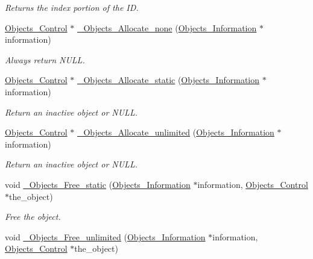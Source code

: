 \begin{DoxyCompactItemize}
\begin{DoxyCompactList}\small\item\em Returns the index portion of the ID. \end{DoxyCompactList}\item 
\mbox{\hyperlink{structObjects__Control}{Objects\+\_\+\+Control}} $\ast$ \mbox{\hyperlink{group__RTEMSScoreObject_gab0861c8e235b2892f2785b6cf582c74e}{\+\_\+\+Objects\+\_\+\+Allocate\+\_\+none}} (\mbox{\hyperlink{structObjects__Information}{Objects\+\_\+\+Information}} $\ast$information)
\begin{DoxyCompactList}\small\item\em Always return N\+U\+LL. \end{DoxyCompactList}\item 
\mbox{\hyperlink{structObjects__Control}{Objects\+\_\+\+Control}} $\ast$ \mbox{\hyperlink{group__RTEMSScoreObject_ga93a072e4b17ff04e60d29e57e6901ce1}{\+\_\+\+Objects\+\_\+\+Allocate\+\_\+static}} (\mbox{\hyperlink{structObjects__Information}{Objects\+\_\+\+Information}} $\ast$information)
\begin{DoxyCompactList}\small\item\em Return an inactive object or N\+U\+LL. \end{DoxyCompactList}\item 
\mbox{\hyperlink{structObjects__Control}{Objects\+\_\+\+Control}} $\ast$ \mbox{\hyperlink{group__RTEMSScoreObject_ga0a7f6c580a3b8f84842df598a283b890}{\+\_\+\+Objects\+\_\+\+Allocate\+\_\+unlimited}} (\mbox{\hyperlink{structObjects__Information}{Objects\+\_\+\+Information}} $\ast$information)
\begin{DoxyCompactList}\small\item\em Return an inactive object or N\+U\+LL. \end{DoxyCompactList}\item 
void \mbox{\hyperlink{group__RTEMSScoreObject_ga080ce791a8c319fbad853973fa53cf58}{\+\_\+\+Objects\+\_\+\+Free\+\_\+static}} (\mbox{\hyperlink{structObjects__Information}{Objects\+\_\+\+Information}} $\ast$information, \mbox{\hyperlink{structObjects__Control}{Objects\+\_\+\+Control}} $\ast$the\+\_\+object)
\begin{DoxyCompactList}\small\item\em Free the object. \end{DoxyCompactList}\item 
void \mbox{\hyperlink{group__RTEMSScoreObject_gae07a394b03c4cb77414045f2fca32e62}{\+\_\+\+Objects\+\_\+\+Free\+\_\+unlimited}} (\mbox{\hyperlink{structObjects__Information}{Objects\+\_\+\+Information}} $\ast$information, \mbox{\hyperlink{structObjects__Control}{Objects\+\_\+\+Control}} $\ast$the\+\_\+object)

\end{DoxyCompactItemize}
